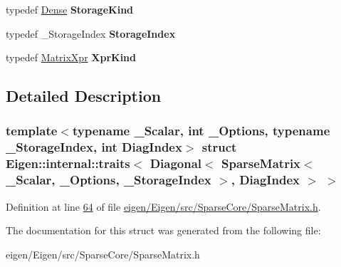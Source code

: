 \begin{DoxyCompactItemize}
typedef \hyperlink{struct_eigen_1_1_dense}{Dense} {\bfseries Storage\+Kind}
\item 
\mbox{\label{struct_eigen_1_1internal_1_1traits_3_01_diagonal_3_01_sparse_matrix_3_01___scalar_00_01___option6bd26e34064fdba33a44f3bb621d4cca_a206fb3894be23d78d2dbe4d480a192f4}} 
typedef \+\_\+\+Storage\+Index {\bfseries Storage\+Index}
\item 
\mbox{\label{struct_eigen_1_1internal_1_1traits_3_01_diagonal_3_01_sparse_matrix_3_01___scalar_00_01___option6bd26e34064fdba33a44f3bb621d4cca_a05c46c638e1414ea59344d43a092c168}} 
typedef \hyperlink{struct_eigen_1_1_matrix_xpr}{Matrix\+Xpr} {\bfseries Xpr\+Kind}
\end{DoxyCompactItemize}


\subsection{Detailed Description}
\subsubsection*{template$<$typename \+\_\+\+Scalar, int \+\_\+\+Options, typename \+\_\+\+Storage\+Index, int Diag\+Index$>$\newline
struct Eigen\+::internal\+::traits$<$ Diagonal$<$ Sparse\+Matrix$<$ \+\_\+\+Scalar, \+\_\+\+Options, \+\_\+\+Storage\+Index $>$, Diag\+Index $>$ $>$}



Definition at line \hyperlink{eigen_2_eigen_2src_2_sparse_core_2_sparse_matrix_8h_source_l00064}{64} of file \hyperlink{eigen_2_eigen_2src_2_sparse_core_2_sparse_matrix_8h_source}{eigen/\+Eigen/src/\+Sparse\+Core/\+Sparse\+Matrix.\+h}.



The documentation for this struct was generated from the following file\+:\begin{DoxyCompactItemize}
\item 
eigen/\+Eigen/src/\+Sparse\+Core/\+Sparse\+Matrix.\+h\end{DoxyCompactItemize}
